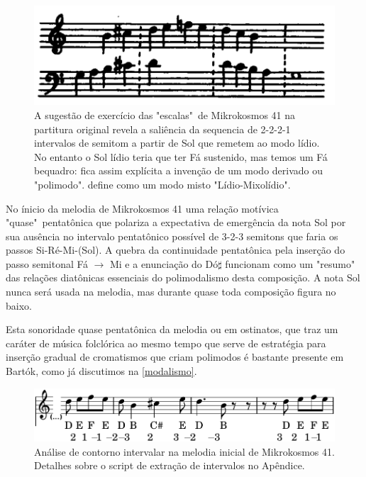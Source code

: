 \documentclass[
	12pt,				%
	openright,			%
	twoside,			%
	a4paper,			%
	english,			%
	french,				%
	spanish,			%
	brazil				%
	]{abntex2}
\begin{document}
\begin{figure}[!h]
	\caption{\label{fig_grafico}A sugestão de exercício das "escalas"\ de Mikrokosmos 41 na partitura original revela a saliência da sequencia de 2-2-2-1 intervalos de semitom a partir de Sol que remetem ao modo lídio. No entanto o Sol lídio teria que ter Fá sustenido, mas temos um Fá bequadro: fica assim explícita a invenção de um modo derivado ou "polimodo".  define como um modo misto "Lídio-Mixolídio". } 
	\begin{center}
	    \includegraphics[scale=0.3]{estudosM21/mikro041_exercicio.png}
	\end{center}
\end{figure}


No ínicio da melodia de Mikrokosmos 41 uma relação motívica "quase"\ pentatônica que polariza a expectativa de emergência da nota Sol por sua ausência no intervalo pentatônico possível de 3-2-3 semitons que faria os passos Si-Ré-Mi-(Sol). A quebra da continuidade pentatônica pela inserção do passo semitonal Fá $ \rightarrow $ Mi e a enunciação do Dó$\sharp$ funcionam como um "resumo" das relações diatônicas essenciais do polimodalismo desta composição. A nota Sol nunca será usada na melodia, mas durante quase toda composição figura no baixo.

Esta sonoridade quase pentatônica da melodia ou em ostinatos, que traz um caráter de música folclórica ao mesmo tempo que serve de estratégia para inserção gradual de cromatismos que criam polimodos é bastante presente em Bartók, como já discutimos na \autoref{modalismo}.

\begin{figure}[!h]
	\caption{\label{fig_grafico} Análise de contorno intervalar na melodia inicial de Mikrokosmos 41. Detalhes sobre o script de extração de intervalos no Apêndice.  } 
	\begin{center}
	    \includegraphics[scale=0.3]{estudosM21/mikro041_contorno01.png}
	\end{center}
\end{figure}
\end{document}
